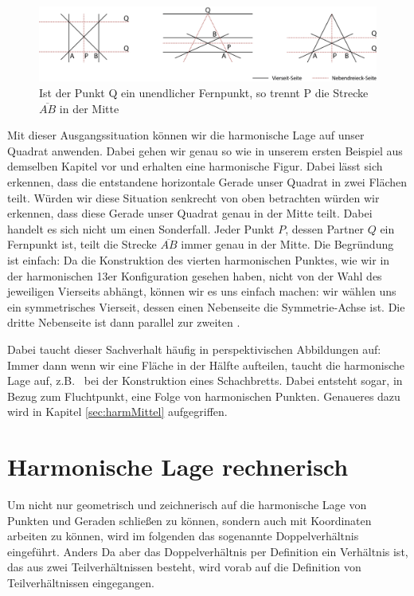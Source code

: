 \documentclass[12pt,a4paper]{article}
\begin{document}
\begin{figure}[htbp]
\centering
\includegraphics[width=\textwidth]{Bilder/inftyPoint.png}
\caption{Ist der Punkt Q ein unendlicher Fernpunkt, so trennt P die Strecke $\overline{A B}$ in der Mitte}
\label{fig:inftyPoint}
\end{figure}

Mit dieser Ausgangssituation können wir die harmonische Lage auf unser Quadrat anwenden. Dabei gehen wir genau so wie in unserem ersten Beispiel aus demselben Kapitel vor und erhalten eine harmonische Figur. Dabei lässt sich erkennen, dass die entstandene horizontale Gerade unser Quadrat in zwei Flächen teilt. Würden wir diese Situation senkrecht von oben betrachten würden wir erkennen, dass diese Gerade unser Quadrat genau in der Mitte teilt. Dabei handelt es sich nicht um einen Sonderfall. Jeder Punkt $P$, dessen Partner $Q$ ein Fernpunkt ist, teilt die Strecke $\overline{A B}$ immer genau in der Mitte.
\newline
Die Begründung ist einfach: Da die Konstruktion des vierten harmonischen Punktes, wie wir in der harmonischen 13er Konfiguration gesehen haben, nicht von der Wahl des jeweiligen Vierseits abhängt, können wir es uns einfach machen: wir wählen uns ein symmetrisches Vierseit, dessen einen Nebenseite die Symmetrie-Achse ist. Die dritte Nebenseite ist dann parallel zur zweiten \citep[vgl.~][S.~50]{projektiveGeometrie}.

Dabei taucht dieser Sachverhalt häufig in perspektivischen Abbildungen auf: Immer dann wenn wir eine Fläche in der Hälfte aufteilen, taucht die harmonische Lage auf, z.B.~ bei der Konstruktion eines Schachbretts. Dabei entsteht sogar, in Bezug zum Fluchtpunkt, eine Folge von harmonischen Punkten. Genaueres dazu wird in Kapitel \ref{sec:harmMittel} aufgegriffen.

\newpage
\section{Harmonische Lage rechnerisch}
Um nicht nur geometrisch und zeichnerisch auf die harmonische Lage von Punkten und Geraden schließen zu können, sondern auch mit Koordinaten arbeiten zu können, wird im folgenden das sogenannte Doppelverhältnis eingeführt. Anders Da aber das Doppelverhältnis per Definition ein Verhältnis ist, das aus zwei Teilverhältnissen besteht, wird vorab auf die Definition von Teilverhältnissen eingegangen.
\end{document}

